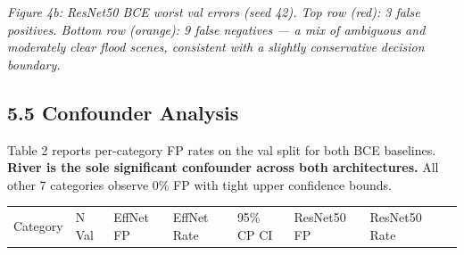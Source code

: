 \documentclass[
  11pt,
]{article}
\newcounter{none} %
\begin{document}
\emph{Figure 4b: ResNet50 BCE worst val errors (seed 42). Top row (red):
3 false positives. Bottom row (orange): 9 false negatives --- a mix of
ambiguous and moderately clear flood scenes, consistent with a slightly
conservative decision boundary.}

\subsection{5.5 Confounder Analysis}\label{confounder-analysis}

Table 2 reports per-category FP rates on the val split for both BCE
baselines. \textbf{River is the sole significant confounder across both
architectures.} All other 7 categories observe 0\% FP with tight upper
confidence bounds.

{\def\LTcaptype{none} %
\begin{longtable}[]{@{}
  >{\raggedright\arraybackslash}p{}
  >{\raggedright\arraybackslash}p{}
  >{\raggedright\arraybackslash}p{}
  >{\raggedright\arraybackslash}p{}
  >{\raggedright\arraybackslash}p{}
  >{\raggedright\arraybackslash}p{}
  >{\raggedright\arraybackslash}p{}
  >{\raggedright\arraybackslash}p{}@{}}
\toprule\noalign{}
\begin{minipage}[b]{\linewidth}\raggedright
Category
\end{minipage} & \begin{minipage}[b]{\linewidth}\raggedright
N Val
\end{minipage} & \begin{minipage}[b]{\linewidth}\raggedright
EffNet FP
\end{minipage} & \begin{minipage}[b]{\linewidth}\raggedright
EffNet Rate
\end{minipage} & \begin{minipage}[b]{\linewidth}\raggedright
95\% CP CI
\end{minipage} & \begin{minipage}[b]{\linewidth}\raggedright
ResNet50 FP
\end{minipage} & \begin{minipage}[b]{\linewidth}\raggedright
ResNet50 Rate
\end{minipage} & \begin{minipage}[b]{\linewidth}\raggedright

\end{minipage}
\end{longtable}}
\end{document}
